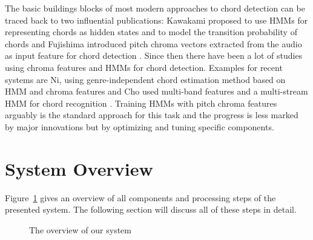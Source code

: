 \documentclass{article}
\begin{document}
The basic buildings blocks of most modern approaches to chord detection can be traced back to two influential publications: Kawakami proposed to use HMMs for representing chords as hidden states and to model the transition probability of chords \cite{kawakami2000hidden} and Fujishima introduced pitch chroma vectors extracted from the audio as input feature for chord detection \cite{fujishima1999realtime}. Since then there have been a lot of studies using chroma features and HMMs for chord detection\cite{papadopoulos2007large,cho2010exploring}. Examples for recent systems are  Ni, using genre-independent chord estimation method based on HMM and chroma features \cite{ni2012using} and Cho used multi-band features and a multi-stream HMM for chord recognition \cite{cho2013mirex}. Training HMMs with pitch chroma features arguably is the standard approach for this task and the progress is less marked by major innovations but by optimizing and tuning specific components. 



\section{System Overview}
Figure~\ref{fig:overview} gives an overview of all components and processing steps of the presented system. The following section will discuss all of these steps in detail.
\begin{figure}
 \centerline{}
 \caption{The overview of our system}
 \label{fig:overview}
\end{figure}
\end{document}

